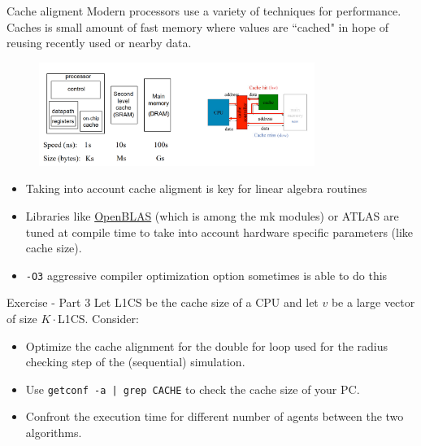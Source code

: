 \documentclass[10pt,aspectratio=169]{beamer}
\begin{document}
\begin{frame}{Cache aligment}
    Modern processors use a variety of techniques for performance. Caches is small amount of fast memory where values are ``cached" in hope of reusing recently used or nearby data.
    \begin{figure}
        \centering\includegraphics[width=0.8\textwidth]{cache.png}
    \end{figure}
    \begin{itemize}
        \item Taking into account cache aligment is key for linear algebra routines
        \item Libraries like \href{https://github.com/xianyi/OpenBLAS}{OpenBLAS} (which is among the mk modules) or ATLAS are tuned at compile time to take into account hardware specific parameters (like cache size).
        \item \texttt{-O3} aggressive compiler optimization option sometimes is able to do this
    \end{itemize}
\end{frame}

\begin{frame}{Exercise - Part 3}
    Let L1CS be the cache size of a CPU and let $v$ be a large vector of size $K\cdot$L1CS. Consider:
    
    \begin{itemize}
        \item Optimize the cache alignment for the double for loop used for the radius checking step of the (sequential) simulation.
        \item Use \texttt{getconf -a | grep CACHE} to check the cache size of your PC.
        \item Confront the execution time for different number of agents between the two algorithms.
    \end{itemize}
\end{frame}
\end{document}
